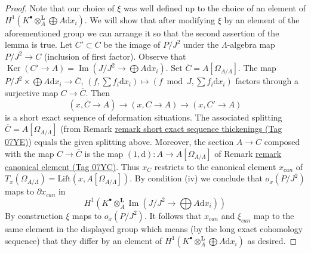 \documentclass{amsart}
\theoremstyle{plain}
\theoremstyle{definition}
\theoremstyle{remark}
\numberwithin{equation}{subsection}
\def\Ker{\mathop{\mathrm{Ker}}}
\def\Im{\mathop{\mathrm{Im}}}
\begin{document}
\begin{proof}
\medskip\noindent
Note that our choice of $\xi$ was well defined up to the choice of an
element of $H^1(K^\bullet \otimes_A^\mathbf{L} \bigoplus A\text{d}x_i)$.
We will show that after modifying $\xi$ by an element of the aforementioned
group we can arrange it so that the second assertion of the lemma is true.
Let $C' \subset C$ be the image of $P/J^2$ under the
$\Lambda$-algebra map $P/J^2 \to C$ (inclusion of first factor).
Observe that
$\Ker(C' \to A) = \Im(J/J^2 \to \bigoplus A\text{d}x_i)$.
Set $\overline{C} = A[\Omega_{A/\Lambda}]$. The map
$P/J^2 \times \bigoplus A \text{d}x_i \to \overline{C}$,
$(f, \sum f_i \text{d}x_i) \mapsto (f \bmod J, \sum f_i \text{d}x_i)$
factors through a surjective map $C \to \overline{C}$. Then
$$
(x, \overline{C} \to A) \to (x, C \to A) \to (x, C' \to A)
$$
is a short exact sequence of deformation situations. The
associated splitting $\overline{C} = A[\Omega_{A/\Lambda}]$ (from
Remark \href{https://stacks.math.columbia.edu/tag/07YE}{remark short exact sequence thickenings (Tag 07YE)}) equals the given
splitting above. Moreover, the section $A \to C$ composed with the map
$C \to \overline{C}$
is the map $(1, \text{d}) : A \to A[\Omega_{A/\Lambda}]$ of
Remark \href{https://stacks.math.columbia.edu/tag/07YC}{remark canonical element (Tag 07YC)}.
Thus $x_C$ restricts to the canonical element $x_{can}$ of
$T_x(\Omega_{A/\Lambda}) = \text{Lift}(x, A[\Omega_{A/\Lambda}])$.
By condition (iv) we conclude that $o_x(P/J^2)$ maps to $\partial x_{can}$
in
$$
H^1(K^\bullet \otimes_A^\mathbf{L} \Im(J/J^2 \to \bigoplus A\text{d}x_i))
$$
By construction $\xi$ maps to $o_x(P/J^2)$. It follows that
$x_{can}$ and $\xi_{can}$ map to the same element in the
displayed group which means (by the long exact cohomology sequence)
that they differ by an element of
$H^1(K^\bullet \otimes_A^\mathbf{L} \bigoplus A\text{d}x_i)$
as desired.
\end{proof}
\end{document}
